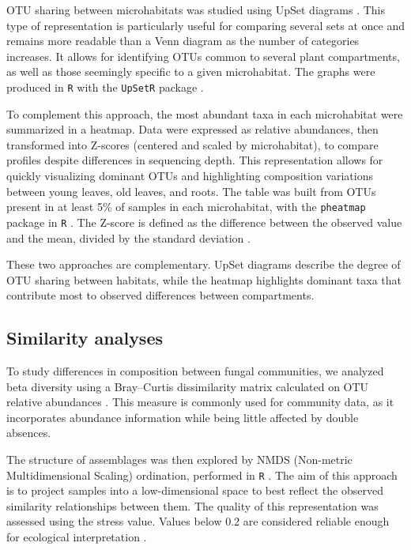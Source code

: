 \documentclass[alpha-refs,twocolumn]{wiley-article}
\begin{document}
OTU sharing between microhabitats was studied using UpSet diagrams \citep{lex2014upset}. This type of representation is particularly useful for comparing several sets at once and remains more readable than a Venn diagram as the number of categories increases. It allows for identifying OTUs common to several plant compartments, as well as those seemingly specific to a given microhabitat. The graphs were produced in \texttt{R} with the \texttt{UpSetR} package \citep{conway2017upsetr}.

To complement this approach, the most abundant taxa in each microhabitat were summarized in a heatmap. Data were expressed as relative abundances, then transformed into Z-scores (centered and scaled by microhabitat), to compare profiles despite differences in sequencing depth. This representation allows for quickly visualizing dominant OTUs and highlighting composition variations between young leaves, old leaves, and roots. The table was built from OTUs present in at least 5\% of samples in each microhabitat, with the \texttt{pheatmap} package in \texttt{R} \citep{kolde2019pheatmap}. The Z-score is defined as the difference between the observed value and the mean, divided by the standard deviation \citep{altman1991practical}.

These two approaches are complementary. UpSet diagrams describe the degree of OTU sharing between habitats, while the heatmap highlights dominant taxa that contribute most to observed differences between compartments.

\subsection{Similarity analyses}

To study differences in composition between fungal communities, we analyzed beta diversity using a Bray--Curtis dissimilarity matrix calculated on OTU relative abundances \citep{bray1957ordination}. This measure is commonly used for community data, as it incorporates abundance information while being little affected by double absences.

The structure of assemblages was then explored by NMDS (Non-metric Multidimensional Scaling) ordination, performed in \texttt{R} \citep{kruskal1964nonmetric,minchin1987evaluation}. The aim of this approach is to project samples into a low-dimensional space to best reflect the observed similarity relationships between them. The quality of this representation was assessed using the stress value. Values below 0.2 are considered reliable enough for ecological interpretation \citep{kruskal1964nonmetric}.
\end{document}
